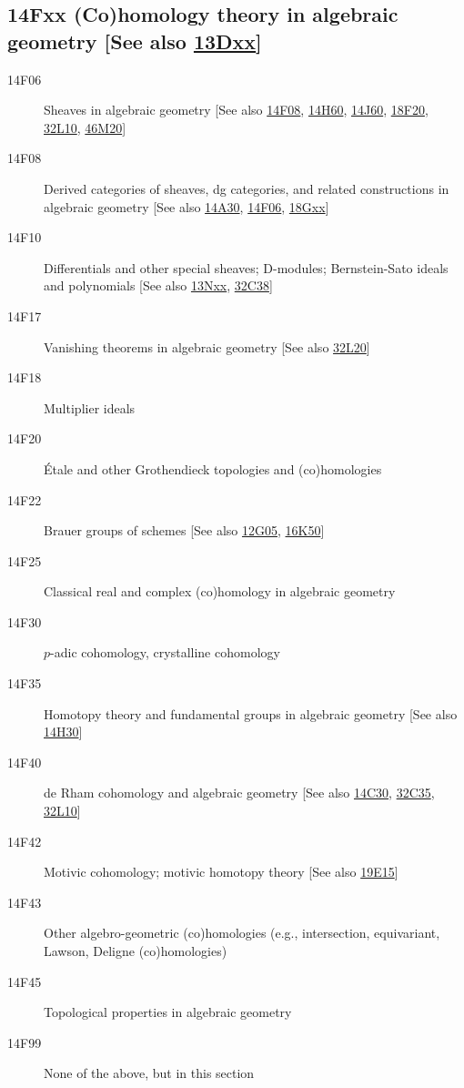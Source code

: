 \documentclass[letterpaper]{article}
\begin{document}
\subsection*{14Fxx  (Co)homology theory in algebraic geometry [See also \hyperref[13Dxx]{13Dxx}] }\label{14Fxx}
\begin{description}     
\item [14F06]\label{14F06} Sheaves in algebraic geometry [See also \hyperref[14F08]{14F08}, \hyperref[14H60]{14H60}, \hyperref[14J60]{14J60}, \hyperref[18F20]{18F20}, \hyperref[32L10]{32L10}, \hyperref[46M20]{46M20}]
\item [14F08]\label{14F08} Derived categories of sheaves, dg categories, and related constructions in algebraic geometry [See also \hyperref[14A30]{14A30}, \hyperref[14F06]{14F06}, \hyperref[18Gxx]{18Gxx}]
\item [14F10]\label{14F10} Differentials and other special sheaves; D-modules; Bernstein-Sato ideals and polynomials [See also \hyperref[13Nxx]{13Nxx}, \hyperref[32C38]{32C38}]
\item [14F17]\label{14F17} Vanishing theorems in algebraic geometry [See also \hyperref[32L20]{32L20}]
\item [14F18]\label{14F18} Multiplier ideals
\item [14F20]\label{14F20} \'{E}tale and other Grothendieck topologies and (co)homologies
\item [14F22]\label{14F22} Brauer groups of schemes [See also \hyperref[12G05]{12G05}, \hyperref[16K50]{16K50}]
\item [14F25]\label{14F25} Classical real and complex (co)homology in algebraic geometry
\item [14F30]\label{14F30} $p$-adic cohomology, crystalline cohomology
\item [14F35]\label{14F35} Homotopy theory and fundamental groups in algebraic geometry [See also \hyperref[14H30]{14H30}]
\item [14F40]\label{14F40} de Rham cohomology and algebraic geometry [See also \hyperref[14C30]{14C30}, \hyperref[32C35]{32C35}, \hyperref[32L10]{32L10}]
\item [14F42]\label{14F42} Motivic cohomology; motivic homotopy theory [See also \hyperref[19E15]{19E15}]
\item [14F43]\label{14F43} Other algebro-geometric (co)homologies (e.g., intersection, equivariant, Lawson, Deligne (co)homologies)
\item [14F45]\label{14F45} Topological properties in algebraic geometry
\item [14F99]\label{14F99} None of the above, but in this section
\end{description}          
\end{document}
